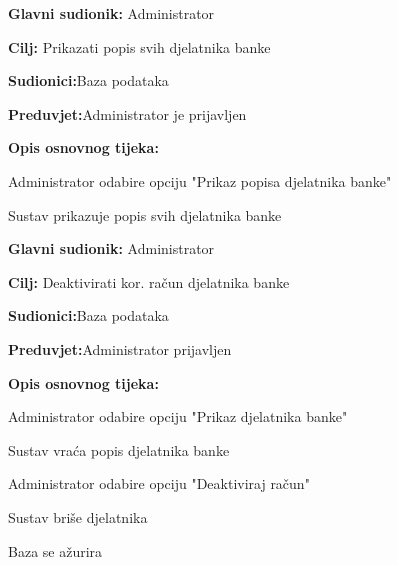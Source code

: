 \eject
\noindent {}

\begin{packed_item}
	
	\item \textbf{Glavni sudionik: }{Administrator}
	\item  \textbf{Cilj:} {Prikazati popis svih djelatnika banke}
	\item  \textbf{Sudionici:}{Baza podataka} 
	\item  \textbf{Preduvjet:}{Administrator je prijavljen}
	\item  \textbf{Opis osnovnog tijeka:}
	
	\item[] \begin{packed_enum}
		
		\item {Administrator odabire opciju "Prikaz popisa djelatnika banke"}
		\item {Sustav prikazuje popis svih djelatnika banke}
		\end{packed_enum}
\end{packed_item}


\noindent {}

\begin{packed_item}
	\item \textbf{Glavni sudionik: }{Administrator}
	\item  \textbf{Cilj:} {Deaktivirati kor. račun djelatnika banke}
	\item  \textbf{Sudionici:}{Baza podataka}
	\item  \textbf{Preduvjet:}{Administrator prijavljen}
	\item  \textbf{Opis osnovnog tijeka:}
	
	\item[] \begin{packed_enum}
		
		\item {Administrator odabire opciju "Prikaz djelatnika banke"}
		\item {Sustav vraća popis djelatnika banke}
		\item {Administrator odabire opciju "Deaktiviraj račun"}
		\item {Sustav briše djelatnika}
		\item {Baza se ažurira}
	\end{packed_enum}
	
\end{packed_item}


